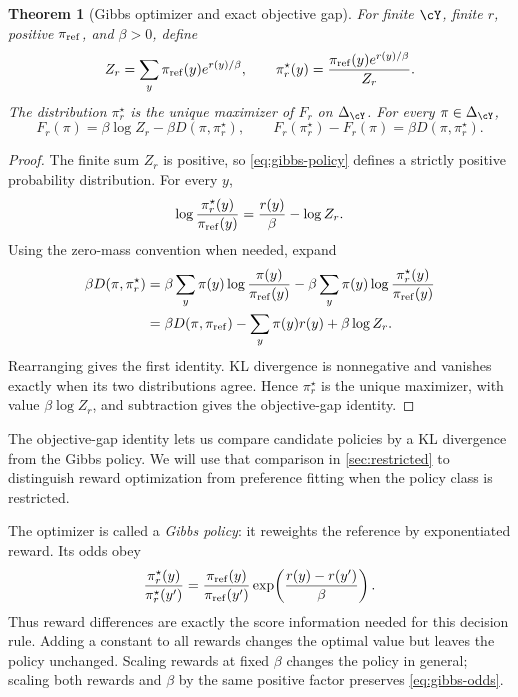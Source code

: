 \documentclass[11pt,twoside]{article}
\newcommand{\KL}{D}
\newtheorem{theorem}{Theorem}[section]
\theoremstyle{definition}
\theoremstyle{remark}
\begin{document}
\begin{theorem}[Gibbs optimizer and exact objective gap]
\label{thm:gibbs}
For finite $\cY$, finite $r$, positive $\pi_{\rm ref}$, and $\beta>0$,
define
\begin{equation}
 Z_r=\sum_y\pi_{\rm ref}(y)e^{r(y)/\beta},\qquad
 \pi_r^\star(y)=\frac{\pi_{\rm ref}(y)e^{r(y)/\beta}}{Z_r}.
 \label{eq:gibbs-policy}
\end{equation}
The distribution $\pi_r^\star$ is the unique maximizer of $F_r$ on
$\Delta_{\cY}$. For every $\pi\in\Delta_{\cY}$,
\begin{equation}
 F_r(\pi)=\beta\log Z_r-\beta\KL(\pi,\pi_r^\star),\qquad
 F_r(\pi_r^\star)-F_r(\pi)=\beta\KL(\pi,\pi_r^\star).
 \label{eq:gibbs-gap}
\end{equation}
\end{theorem}

\begin{proof}
The finite sum $Z_r$ is positive, so \cref{eq:gibbs-policy} defines a
strictly positive probability distribution. For every $y$,
\[
 \log\frac{\pi_r^\star(y)}{\pi_{\rm ref}(y)}
 =\frac{r(y)}{\beta}-\log Z_r.
\]
Using the zero-mass convention when needed, expand
\begin{align*}
 \beta\KL(\pi,\pi_r^\star)
 &=\beta\sum_y\pi(y)\log\frac{\pi(y)}{\pi_{\rm ref}(y)}
   -\beta\sum_y\pi(y)\log\frac{\pi_r^\star(y)}{\pi_{\rm ref}(y)}\\
 &=\beta\KL(\pi,\pi_{\rm ref})-\sum_y\pi(y)r(y)+\beta\log Z_r.
\end{align*}
Rearranging gives the first identity. KL divergence is nonnegative and
vanishes exactly when its two distributions agree. Hence $\pi_r^\star$
is the unique maximizer, with value $\beta\log Z_r$, and subtraction
gives the objective-gap identity.
\end{proof}

The objective-gap identity lets us compare candidate policies by a KL
divergence from the Gibbs policy. We will use that comparison in
\cref{sec:restricted} to distinguish reward optimization from preference
fitting when the policy class is restricted.

The optimizer is called a \emph{Gibbs policy}: it reweights the reference
by exponentiated reward. Its odds obey
\begin{equation}
 \frac{\pi_r^\star(y)}{\pi_r^\star(y')}
 =\frac{\pi_{\rm ref}(y)}{\pi_{\rm ref}(y')}
   \exp\!\left(\frac{r(y)-r(y')}{\beta}\right).
 \label{eq:gibbs-odds}
\end{equation}
Thus reward differences are exactly the score information needed for this
decision rule. Adding a constant to all rewards changes the optimal value
but leaves the policy unchanged. Scaling rewards at fixed $\beta$ changes
the policy in general; scaling both rewards and $\beta$ by the same
positive factor preserves \cref{eq:gibbs-odds}.
\end{document}
